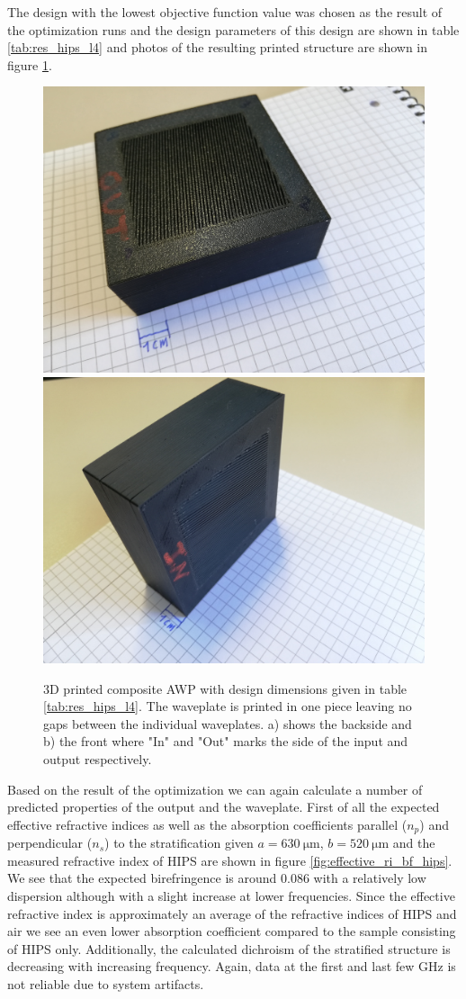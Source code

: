 The design with the lowest objective function value was chosen as the result of the optimization runs and the design parameters of this design are shown in table \ref{tab:res_hips_l4} and photos of the resulting printed structure are shown in figure \ref{fig:sent2david}.

\begin{figure}[H]
    \centering
    \subcaptionbox{\label{fig:sent2david_1}}
        {\includegraphics[width=0.47\linewidth]{images/5_chapter05/polymer/sent2david_1.jpg}}
    \subcaptionbox{\label{fig:sent2david_2}}
        {\includegraphics[width=0.47\linewidth]{images/5_chapter05/polymer/sent2david_2.jpg}}
    \caption{3D printed composite AWP with design dimensions given in table \ref{tab:res_hips_l4}. The waveplate is printed in one piece leaving no gaps between the individual waveplates. a) shows the backside and b) the front where "In" and "Out" marks the side of the input and output respectively.}
    \label{fig:sent2david}
\end{figure}

Based on the result of the optimization we can again calculate a number of predicted properties of the output and the waveplate. First of all the expected effective refractive indices as well as the absorption coefficients parallel ($n_p$) and perpendicular ($n_s$) to the stratification given $a=\SI{630}{\micro \meter}$, $b=\SI{520}{\micro \meter}$ and the measured refractive index of HIPS are shown in figure \ref{fig:effective_ri_bf_hips}. We see that the expected birefringence is around $0.086$ with a relatively low dispersion although with a slight increase at lower frequencies. Since the effective refractive index is approximately an average of the refractive indices of HIPS and air we see an even lower absorption coefficient compared to the sample consisting of HIPS only. Additionally, the calculated dichroism of the stratified structure is decreasing with increasing frequency. Again, data at the first and last few \si{\giga \hertz} is not reliable due to system artifacts.

